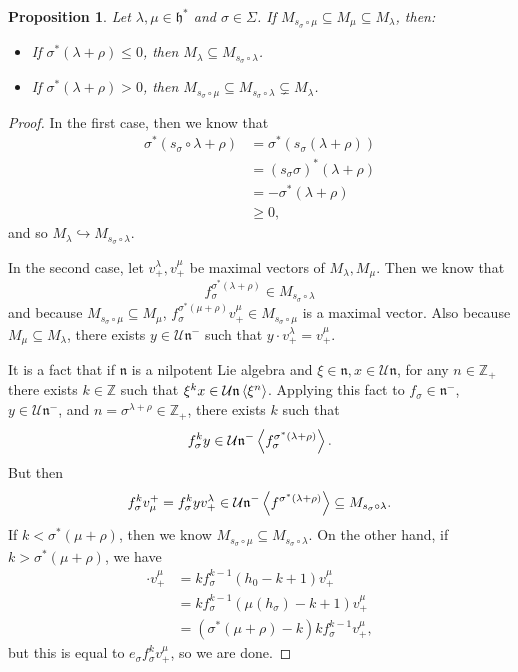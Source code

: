 \documentclass[leqno, openany]{memoir}
\newtheorem{prop}[thm]{Proposition}
\theoremstyle{definition}
\theoremstyle{remark}
\theoremstyle{plain}
\theoremstyle{definition}
\theoremstyle{remark}
\newcommand{\Z}{\mathbb{Z}}
\newcommand{\U}{\mathcal{U}}
\newcommand{\h}{\mathfrak{h}}
\newcommand{\n}{\mathfrak{n}}
\begin{document}
\begin{prop}
    Let $\lambda, \mu \in \h^*$ and $\sigma \in \Sigma$. If $M_{s_{\sigma} \circ \mu} \subseteq M_{\mu} \subseteq M_{\lambda}$, then:
    \begin{itemize}
        \item If $\sigma^*(\lambda + \rho) \leq 0$, then $M_{\lambda} \subseteq M_{s_{\sigma} \circ \lambda}$.
        \item If $\sigma^*(\lambda + \rho) > 0$, then $M_{s_{\sigma} \circ \mu} \subseteq M_{s_{\sigma} \circ \lambda} \subsetneq M_{\lambda}$.
    \end{itemize}
\end{prop}

\begin{proof}
    In the first case, then we know that 
    \begin{align*}
        \sigma^*(s_{\sigma} \circ \lambda + \rho) &= \sigma^* (s_{\sigma}(\lambda + \rho)) \\
        &= (s_{\sigma} \sigma)^* (\lambda + \rho) \\
        &= - \sigma^*(\lambda + \rho) \\
        &\geq 0,
    \end{align*}
    and so $M_{\lambda} \hookrightarrow M_{s_{\sigma} \circ \lambda}$.

    In the second case, let $v_+^{\lambda}, v_+^{\mu}$ be maximal vectors of $M_{\lambda}, M_{\mu}$. Then we know that
    \[ f_{\sigma}^{\sigma^*(\lambda + \rho)} \in M_{s_{\sigma} \circ \lambda} \]
    and because $M_{s_{\sigma} \circ \mu} \subseteq M_{\mu}$, $f_{\sigma}^{\sigma^*(\mu + \rho)} v_+^{\mu} \in M_{s_{\sigma} \circ \mu}$ is a maximal vector. Also because $M_{\mu} \subseteq M_{\lambda}$, there exists $y \in \U \n^-$ such that $y \cdot v_+^{\lambda} = v_+^{\mu}$.

    It is a fact that if $\n$ is a nilpotent Lie algebra and $\xi \in \n, x \in \U \n$, for any $n \in \Z_+$ there exists $k \in \Z$ such that $\xi^k x \in \U \n \ev{\xi^n}$. Applying this fact to $f_{\sigma} \in \n^-$, $y \in \U \n^-$, and $n = \sigma^{\lambda + \rho} \in \Z_+$, there exists $k$ such that
    \[ f_{\sigma}^k y \in \U \n^- \ev{f_{\sigma}^{\sigma^* (\lambda + \rho)}}. \]
    But then 
    \[ f_{\sigma}^k v_{\mu}^+ = f_{\sigma}^k y v_+^{\lambda} \in \U \n^- \ev{f^{\sigma^*(\lambda + \rho)}} \subseteq M_{s_{\sigma} \circ \lambda}. \]
    If $k < \sigma^*(\mu + \rho)$, then we know $M_{s_{\sigma} \circ \mu} \subseteq M_{s_{\sigma} \circ \lambda}$. On the other hand, if $k > \sigma^*(\mu + \rho)$, we have
    \begin{align*}
        [e_{\sigma}, f_{\sigma}^k] \cdot v_+^{\mu} &= k f_{\sigma}^{k-1} (h_0 - k + 1) v_+^{\mu} \\
        &= k f_{\sigma}^{k-1} (\mu(h_{\sigma}) - k+1) v_+^{\mu} \\
        &= (\sigma^* (\mu + \rho) - k) k f_{\sigma}^{k-1} v_+^{\mu},
    \end{align*}
    but this is equal to $e_{\sigma}f_{\sigma}^k v_+^{\mu}$, so we are done.
\end{proof}
\end{document}
